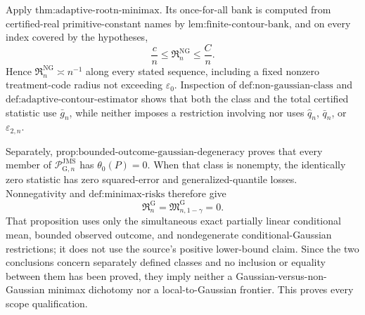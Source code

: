 Apply \(\text{thm:adaptive-rootn-minimax}\).  Its once-for-all bank is computed from certified-real primitive-constant names by \(\text{lem:finite-contour-bank}\), and on every index covered by the hypotheses,
\[
 \frac cn\le\mathfrak R_n^{\mathrm{NG}}\le\frac Cn.
\]
Hence \(\mathfrak R_n^{\mathrm{NG}}\asymp n^{-1}\) along every stated sequence, including a fixed nonzero treatment-code radius not exceeding \(\varepsilon_0\).  Inspection of \(\text{def:non-gaussian-class}\) and \(\text{def:adaptive-contour-estimator}\) shows that both the class and the total certified statistic use \(\bar g_n\), while neither imposes a restriction involving nor uses \(\widehat q_n\), \(\bar q_n\), or \(\varepsilon_{2,n}\).

Separately, \(\text{prop:bounded-outcome-gaussian-degeneracy}\) proves that every member of \(\mathcal P_{\mathrm G,n}^{\mathrm{JMS}}\) has \(\theta_0(P)=0\).  When that class is nonempty, the identically zero statistic has zero squared-error and generalized-quantile losses.  Nonnegativity and \(\text{def:minimax-risks}\) therefore give
\[
 \mathfrak R_n^{\mathrm G}
 =\mathfrak M_{n,1-\gamma}^{\mathrm G}=0.
\]
That proposition uses only the simultaneous exact partially linear conditional mean, bounded observed outcome, and nondegenerate conditional-Gaussian restrictions; it does not use the source's positive lower-bound claim.  Since the two conclusions concern separately defined classes and no inclusion or equality between them has been proved, they imply neither a Gaussian-versus-non-Gaussian minimax dichotomy nor a local-to-Gaussian frontier.  This proves every scope qualification.